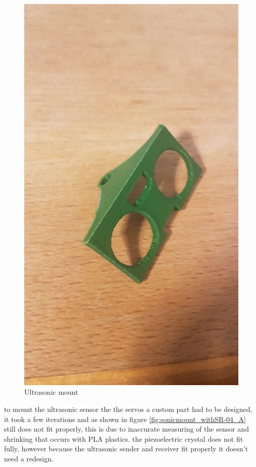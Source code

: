 \begin{figure}[h]
\begin{minipage}{.5\textwidth}
	\includegraphics[width = 1\textwidth]{"assets/sonicmount_B"}
	\centering
\end{minipage}
\caption{Ultrasonic mount}
	\label{fig:sonicmount}
\end{figure}

to mount the ultrasonic sensor the the servos a custom part had to be designed, it took a few iterations and as shown in figure    \ref{fig:sonicmount_withSR-04_A} still does not fit properly, this is due to inaccurate measuring of the sensor and shrinking that occurs with PLA plastics. the piezoelectric crystal does not fit fully, however because the ultrasonic sender and receiver fit properly it doesn't need a redesign.  

